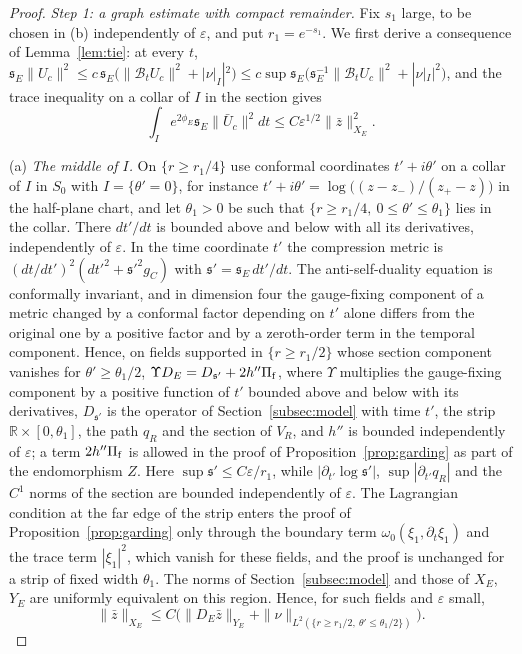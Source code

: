 \documentclass[11pt]{amsart}
\theoremstyle{definition}
\theoremstyle{remark}
\theoremstyle{plain}
\numberwithin{equation}{section}
\newcommand{\RR}{\mathbb{R}}
\newcommand{\eps}{\varepsilon}
\begin{document}
\begin{proof}
\emph{Step 1: a graph estimate with compact remainder.} Fix $s_1$ large, to be
chosen in (b) independently of $\eps$, and put $r_1=e^{-s_1}$. We first derive
a consequence of Lemma~\ref{lem:tie}: at every $t$,
${\mathfrak s}_E\|U_c\|^2\le c\,{\mathfrak s}_E\bigl(\|\mathcal B_tU_c\|^2+|\nu|_I|^2\bigr)\le
c\sup{\mathfrak s}_E\bigl({\mathfrak s}_E^{-1}\|\mathcal B_tU_c\|^2+|\nu|_I|^2\bigr)$, and the
trace inequality on a collar of $I$ in the section gives
\begin{equation}\label{eq:compression-small}
\int_Ie^{2\phi_E}{\mathfrak s}_E\|\bar U_c\|^2dt\le C\eps^{1/2}\|\bar z\|^2_{X_E}.
\end{equation}

(a) \emph{The middle of $I$.} On $\{r\ge r_1/4\}$ use conformal coordinates
$t'+i\theta'$ on a collar of $I$ in $S_0$ with $I=\{\theta'=0\}$, for instance
$t'+i\theta'=\log\bigl((z-z_-)/(z_+-z)\bigr)$ in the half-plane chart, and let
$\theta_1>0$ be such that $\{r\ge r_1/4,\ 0\le\theta'\le\theta_1\}$ lies in the
collar. There $dt'/dt$ is bounded above and below with all its derivatives,
independently of $\eps$. In the time coordinate $t'$ the compression metric is
$(dt/dt')^2(dt'^2+{\mathfrak s}'^2g_C)$ with ${\mathfrak s}'={\mathfrak s}_E\,dt'/dt$. The anti-self-duality
equation is conformally invariant, and in dimension four the gauge-fixing component of a metric changed by a conformal factor depending on $t'$ alone differs from the original one by a
positive factor and by a zeroth-order term in the temporal component. Hence, on fields
supported in $\{r\ge r_1/2\}$ whose section component vanishes for
$\theta'\ge\theta_1/2$, $\Upsilon D_E=D_{{\mathfrak s}'}+2h''\Pi_{\rm f}$, where $\Upsilon$ multiplies the gauge-fixing component by a positive function of $t'$ bounded above and below with its derivatives,
$D_{{\mathfrak s}'}$ is the operator of Section~\ref{subsec:model} with time $t'$, the strip
$\RR\times[0,\theta_1]$, the path $q_R$ and the section of $V_R$, and $h''$ is bounded
independently of $\eps$; a term $2h''\Pi_{\rm f}$ is allowed in the proof of
Proposition~\ref{prop:garding} as part of the endomorphism $Z$. Here
$\sup{\mathfrak s}'\le C\eps/r_1$, while $|\partial_{t'}\log{\mathfrak s}'|$,
$\sup|\partial_{t'}q_R|$ and the $C^1$ norms of the section are bounded
independently of $\eps$. The Lagrangian condition at the far edge of the strip
enters the proof of Proposition~\ref{prop:garding} only through the boundary term
$\omega_0(\xi_1,\partial_t\xi_1)$ and the trace term $|\xi_1|^2$, which vanish for
these fields, and the proof is unchanged for a strip of fixed width $\theta_1$.
The norms of Section~\ref{subsec:model} and those of $X_E$, $Y_E$ are uniformly
equivalent on this region. Hence, for such fields and $\eps$ small,
\[
\|\bar z\|_{X_E}\le C\bigl(\|D_E\bar z\|_{Y_E}+\|\nu\|_{L^2(\{r\ge r_1/2,\
\theta'\le\theta_1/2\})}\bigr).
\]


\end{proof}
\end{document}
